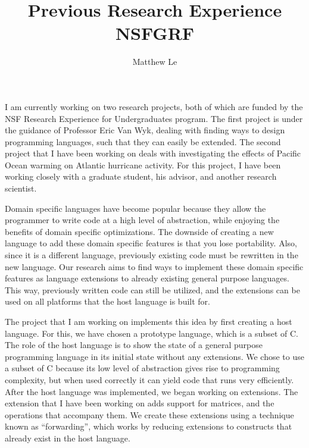 \documentclass[a4paper,12pt]{article}
\title{Previous Research Experience NSFGRF \vspace{-1ex}}
\author{Matthew Le\vspace{-5ex}}
\begin{document}
\maketitle


I am currently working on two research projects, both of which are funded by the NSF Research Experience for Undergraduates program. The first project is under the guidance of Professor Eric Van Wyk, dealing with finding ways to design programming languages, such that they can easily be extended. The second project that I have been working on deals with investigating the effects of Pacific Ocean warming on Atlantic hurricane activity. For this project, I have been working closely with a graduate student, his advisor, and another research scientist.  

Domain specific languages have become popular because they allow the programmer to write code at a high level of abstraction, while enjoying the benefits of domain specific optimizations. The downside of creating a new language to add these domain specific features is that you lose portability. Also, since it is a different language, previously existing code must be rewritten in the new language. Our research aims to find ways to implement these domain specific features as language extensions to already existing general purpose languages. This way, previously written code can still be utilized, and the extensions can be used on all platforms that the host language is built for.  

The project that I am working on implements this idea by first creating a host language. For this, we have chosen a prototype language, which is a subset of C. The role of the host language is to show the state of a general purpose programming language in its initial state without any extensions.  We chose to use a subset of C because its low level of abstraction gives rise to programming complexity, but when used correctly it can yield code that runs very efficiently. After the host language was implemented, we began working on extensions. The extension that I have been working on adds support for matrices, and the operations that accompany them. We create these extensions using a technique known as ``forwarding'', which works by reducing extensions to constructs that already exist in the host language.
\end{document}
